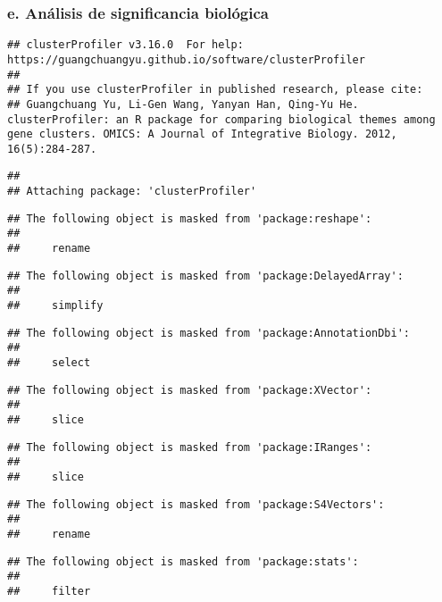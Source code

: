 \documentclass[
]{article}
\begin{document}
\subsubsection{e. Análisis de significancia biológica }

\begin{verbatim}
## clusterProfiler v3.16.0  For help: https://guangchuangyu.github.io/software/clusterProfiler
## 
## If you use clusterProfiler in published research, please cite:
## Guangchuang Yu, Li-Gen Wang, Yanyan Han, Qing-Yu He. clusterProfiler: an R package for comparing biological themes among gene clusters. OMICS: A Journal of Integrative Biology. 2012, 16(5):284-287.
\end{verbatim}

\begin{verbatim}
## 
## Attaching package: 'clusterProfiler'
\end{verbatim}

\begin{verbatim}
## The following object is masked from 'package:reshape':
## 
##     rename
\end{verbatim}

\begin{verbatim}
## The following object is masked from 'package:DelayedArray':
## 
##     simplify
\end{verbatim}

\begin{verbatim}
## The following object is masked from 'package:AnnotationDbi':
## 
##     select
\end{verbatim}

\begin{verbatim}
## The following object is masked from 'package:XVector':
## 
##     slice
\end{verbatim}

\begin{verbatim}
## The following object is masked from 'package:IRanges':
## 
##     slice
\end{verbatim}

\begin{verbatim}
## The following object is masked from 'package:S4Vectors':
## 
##     rename
\end{verbatim}

\begin{verbatim}
## The following object is masked from 'package:stats':
## 
##     filter
\end{verbatim}
\end{document}
